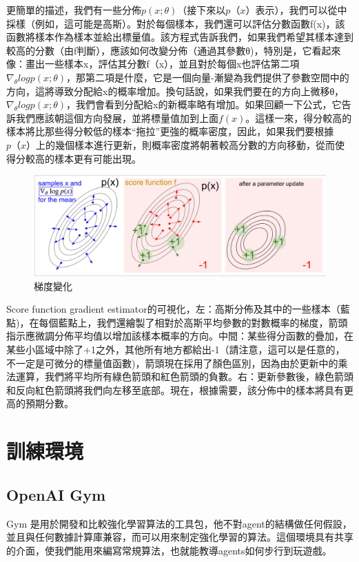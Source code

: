 \documentclass[14pt,a4paper]{report}  %
\begin{document}
更簡單的描述，我們有一些分佈$p(x;\theta)$（接下來以$p（x）$表示），我們可以從中採樣（例如，這可能是高斯）。對於每個樣本，我們還可以評估分數函數f(x)，該函數將樣本作為樣本並給出標量值。該方程式告訴我們，如果我們希望其樣本達到較高的分數（由f判斷），應該如何改變分佈（通過其參數θ)，特別是，它看起來像：畫出一些樣本x，評估其分數f（x），並且對於每個x也評估第二項$\nabla_\theta logp(x;θ)$，那第二項是什麼，它是一個向量-漸變為我們提供了參數空間中的方向，這將導致分配給x的概率增加。換句話說，如果我們要在的方向上微移θ，$\nabla_\theta logp(x;θ)$，我們會看到分配給x的新概率略有增加。如果回顧一下公式，它告訴我們應該朝這個方向發展，並將標量值加到上面$f(x)$。這樣一來，得分較高的樣本將比那些得分較低的樣本“拖拉”更強的概率密度，因此，如果我們要根據$p（x）$上的幾個樣本進行更新，則概率密度將朝著較高分數的方向移動，從而使得分較高的樣本更有可能出現。\\
\begin{figure}[hbt!]
\begin{center}
\includegraphics[scale=0.4]{figure}
\caption{\Large 梯度變化}
\label{梯度變化}
\end{center}
\end{figure}

 Score function gradient estimator的可視化，左：高斯分佈及其中的一些樣本（藍點)，在每個藍點上，我們還繪製了相對於高斯平均參數的對數概率的梯度，箭頭指示應微調分佈平均值以增加該樣本概率的方向。中間：某些得分函數的疊加，在某些小區域中除了+1之外，其他所有地方都給出-1（請注意，這可以是任意的，不一定是可微分的標量值函數)，箭頭現在採用了顏色區別，因為由於更新中的乘法運算，我們將平均所有綠色箭頭和紅色箭頭的負數。右：更新參數後，綠色箭頭和反向紅色箭頭將我們向左移至底部。現在，根據需要，該分佈中的樣本將具有更高的預期分數。\\
\newpage
\chapter{訓練環境}
\section{OpenAI Gym}
 Gym 是用於開發和比較強化學習算法的工具包，他不對agent的結構做任何假設，並且與任何數據計算庫兼容，而可以用來制定強化學習的算法。這個環境具有共享的介面，使我們能用來編寫常規算法，也就能教導agents如何步行到玩遊戲。\\[6pt]
\end{document}
